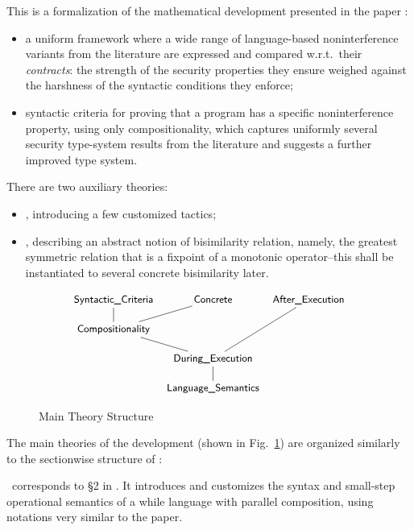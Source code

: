 \noindent
This is a formalization of the mathematical development presented in the paper \cite{pop-pos}: 
%
\begin{itemize}
\item a uniform framework where 
a wide range of language-based noninterference variants from the literature are expressed and 
compared w.r.t.~their {\em contracts}: 
the strength of the security properties they ensure 
weighed against  
the harshness of the syntactic conditions they enforce;  
%
\item syntactic criteria for proving that a program has a specific noninterference
property, using only compositionality, which captures uniformly several 
security type-system results from the literature and suggests a further improved type system.  
\end{itemize}
%
There are two auxiliary theories:
\begin{itemize}
\item \MyTac, introducing a few customized tactics; 
%
\item \Bisim, describing an abstract notion of bisimilarity relation, namely, the greatest 
symmetric relation that is a fixpoint of a monotonic operator--this shall be instantiated 
to several concrete bisimilarity later. 
\end{itemize}

  
\begin{figure}
$$
\xymatrix@C=0.5pc@R=1pc{
     \Synt   & \Conc & \Afte   \\
     \Comp \ar@{-}[u] \ar@{-}[ur] & &   \\
     & \Duri \ar@{-}[ul] \ar@{-}[uur]& \\
     &  \Lang \ar@{-}[u]&                 
}
$$
\vspace*{-3ex}
\caption{Main Theory Structure}
\label{fig-isabelle}
\vspace*{-3ex}
\end{figure} 

The main theories of the development (shown in Fig.~\ref{fig-isabelle}) are 
organized similarly to the sectionwise structure of \cite{pop-pos}:

\Lang\ corresponds to \S2 in \cite{pop-pos}.  It introduces and customizes the syntax and 
small-step operational semantics of a 
while language with parallel composition, using notations very similar to the paper.  

